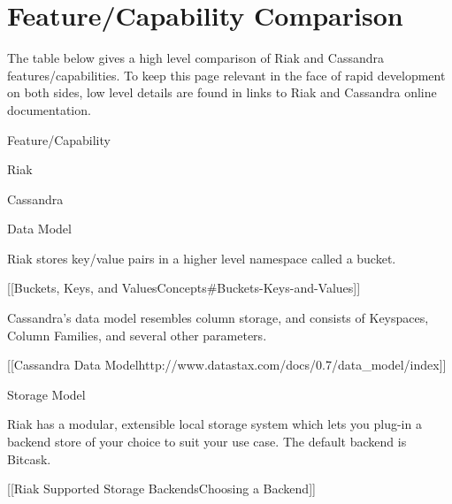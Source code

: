 \documentclass[letter]{book}
\newcounter{tab}[chapter]
\begin{document}
\section{Feature/Capability Comparison}\label{featurecapability-comparison}

The table below gives a high level comparison of Riak and Cassandra features/capabilities. To keep this page relevant in the face of rapid development on both sides, low level details are found in links to Riak and Cassandra online documentation.

Feature/Capability

Riak

Cassandra

Data Model

Riak stores key/value pairs in a higher level namespace called a bucket.

{[}{[}Buckets, Keys, and Values\textbar{}Concepts\#Buckets-Keys-and-Values{]}{]}

Cassandra's data model resembles column storage, and consists of Keyspaces, Column Families, and several other parameters.

{[}{[}Cassandra Data Model\textbar{}http://www.datastax.com/docs/0.7/data\_model/index{]}{]}

Storage Model

Riak has a modular, extensible local storage system which lets you plug-in a backend store of your choice to suit your use case. The default backend is Bitcask.

{[}{[}Riak Supported Storage Backends\textbar{}Choosing a Backend{]}{]}
\end{document}

